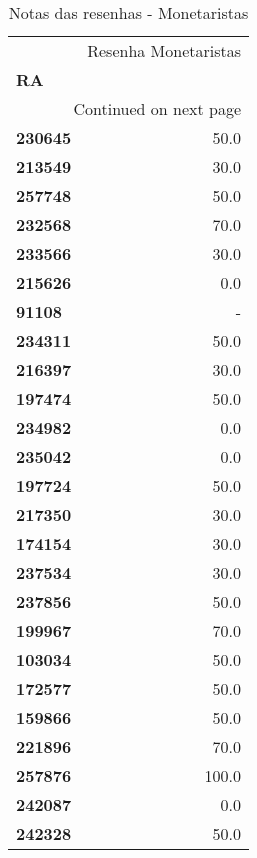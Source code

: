 \documentclass[11pt]{article}
\begin{document}
\begin{center}
\begin{longtable}{lr}
\caption{Notas das resenhas - Monetaristas}\\
\toprule
{} &  Resenha Monetaristas \\
\textbf{RA    } &                       \\
\midrule
\endhead
\midrule
\multicolumn{2}{r}{{Continued on next page}} \\
\midrule
\endfoot

\bottomrule
\endlastfoot
\textbf{230645} &                  50.0 \\
\textbf{213549} &                  30.0 \\
\textbf{257748} &                  50.0 \\
\textbf{232568} &                  70.0 \\
\textbf{233566} &                  30.0 \\
\textbf{215626} &                   0.0 \\
\textbf{91108 } &                     - \\
\textbf{234311} &                  50.0 \\
\textbf{216397} &                  30.0 \\
\textbf{197474} &                  50.0 \\
\textbf{234982} &                   0.0 \\
\textbf{235042} &                   0.0 \\
\textbf{197724} &                  50.0 \\
\textbf{217350} &                  30.0 \\
\textbf{174154} &                  30.0 \\
\textbf{237534} &                  30.0 \\
\textbf{237856} &                  50.0 \\
\textbf{199967} &                  70.0 \\
\textbf{103034} &                  50.0 \\
\textbf{172577} &                  50.0 \\
\textbf{159866} &                  50.0 \\
\textbf{221896} &                  70.0 \\
\textbf{257876} &                 100.0 \\
\textbf{242087} &                   0.0 \\
\textbf{242328} &                  50.0 \\

\end{longtable}
\end{center}
\end{document}
